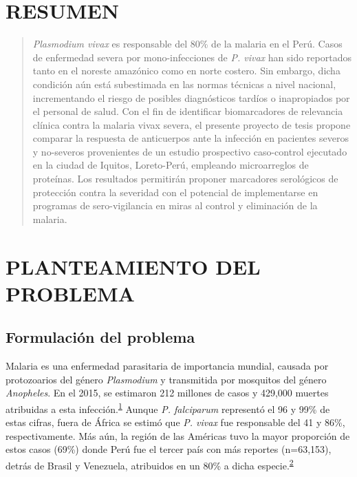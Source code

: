 \documentclass[]{article}
\begin{document}
\vfill
\restoregeometry
\clearpage

\newpage

\tableofcontents

\newpage


\section*{RESUMEN}\label{resumen}

\begin{quote}
\emph{Plasmodium vivax} es responsable del 80\% de la malaria en el
Perú. Casos de enfermedad severa por mono-infecciones de \emph{P. vivax}
han sido reportados tanto en el noreste amazónico como en norte costero.
Sin embargo, dicha condición aún está subestimada en las normas técnicas
a nivel nacional, incrementando el riesgo de posibles diagnósticos
tardíos o inapropiados por el personal de salud. Con el fin de
identificar biomarcadores de relevancia clínica contra la malaria vivax
severa, el presente proyecto de tesis propone comparar la respuesta de
anticuerpos ante la infección en pacientes severos y no-severos
provenientes de un estudio prospectivo caso-control ejecutado en la
ciudad de Iquitos, Loreto-Perú, empleando microarreglos de proteínas.
Los resultados permitirán proponer marcadores serológicos de protección
contra la severidad con el potencial de implementarse en programas de
sero-vigilancia en miras al control y eliminación de la malaria.
\end{quote}

\section{PLANTEAMIENTO DEL PROBLEMA}\label{planteamiento-del-problema}

\subsection{Formulación del problema}\label{intro}

Malaria es una enfermedad parasitaria de importancia mundial, causada
por protozoarios del género \emph{Plasmodium} y transmitida por
mosquitos del género \emph{Anopheles}. En el 2015, se estimaron 212
millones de casos y 429,000 muertes atribuidas a esta
infección.\textsuperscript{\protect\hyperlink{ref-WHO2016world}{1}}
Aunque \emph{P. falciparum} representó el 96 y 99\% de estas cifras,
fuera de África se estimó que \emph{P. vivax} fue responsable del 41 y
86\%, respectivamente. Más aún, la región de las Américas tuvo la mayor
proporción de estos casos (69\%) donde Perú fue el tercer país con más
reportes (n=63,153), detrás de Brasil y Venezuela, atribuidos en un 80\%
a dicha
especie.\textsuperscript{\protect\hyperlink{ref-rosas2016peru}{2}}
\end{document}
